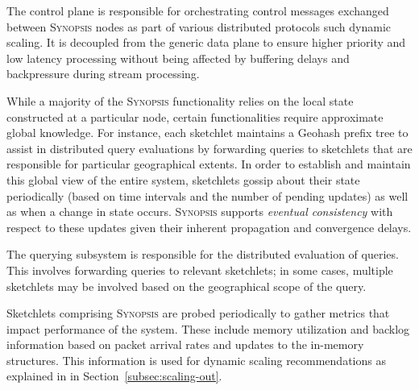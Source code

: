 \begin{description}[leftmargin=*]
	\item[Control plane:] The control plane is responsible for orchestrating control messages exchanged between \textsc{Synopsis} nodes as part of various distributed protocols such dynamic scaling.
    It is decoupled from the generic data plane to ensure higher priority and low latency processing without being affected by buffering delays and backpressure during stream processing.

	\item[Gossip subsystem:] While a majority of the \textsc{Synopsis} functionality relies on the local state constructed at a particular node, certain functionalities require approximate global knowledge.
    For instance, each sketchlet maintains a Geohash prefix tree to assist in distributed query evaluations by forwarding queries to sketchlets that are responsible for particular geographical extents.
        In order to establish and maintain this global view of the entire system, sketchlets gossip about their state periodically (based on time intervals and the number of pending updates) as well as when a change in state occurs.
    \textsc{Synopsis} supports \emph{eventual consistency} with respect to these updates given their inherent propagation and convergence delays.

	\item[Querying subsystem:] The querying subsystem is responsible for the distributed evaluation of queries.
    This involves forwarding queries to relevant sketchlets; in some cases, multiple sketchlets may be involved based on the geographical scope of the query.

    \item[Monitoring subsystem:] Sketchlets comprising \textsc{Synopsis} are probed periodically to gather metrics that impact performance of the system.
    These include memory utilization and backlog information based on packet arrival rates and updates to the in-memory structures.
    This information is used for dynamic scaling recommendations as explained in in Section~\ref{subsec:scaling-out}.
\end{description}
